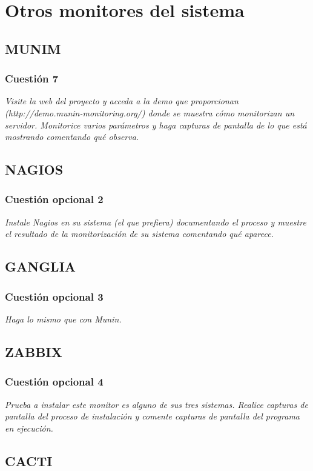 \section{Otros monitores del sistema}
\subsection{MUNIM}


\subsubsection{Cuestión 7}
\textit{Visite la web del proyecto y acceda a la demo que proporcionan (http://demo.munin-monitoring.org/) donde se muestra cómo monitorizan un servidor. Monitorice varios parámetros y haga capturas de pantalla de lo que está mostrando comentando qué observa.}
\subsection{NAGIOS}


\subsubsection{Cuestión opcional 2}
\textit{Instale Nagios en su sistema (el que prefiera) documentando el proceso y muestre el resultado de la monitorización de su sistema comentando qué aparece.}
\subsection{GANGLIA}


\subsubsection{Cuestión opcional 3}
\textit{Haga lo mismo que con Munin.}
\subsection{ZABBIX}


\subsubsection{Cuestión opcional 4}
\textit{Prueba a instalar este monitor es alguno de sus tres sistemas. Realice capturas de pantalla del proceso de instalación y comente capturas de pantalla del programa en ejecución.}
\subsection{CACTI}


